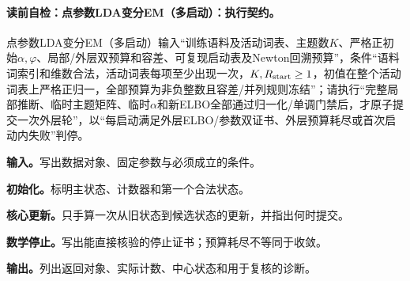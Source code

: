 \paragraph{读前自检：点参数LDA变分EM（多启动）：执行契约。}点参数LDA变分EM（多启动）输入“训练语料及活动词表、主题数$K$、严格正初始$\alpha,\varphi$、局部/外层双预算和容差、可复现启动表及Newton回溯预算”，条件“语料词索引和维数合法，活动词表每项至少出现一次，$K,R_{\rm start}\ge1$，初值在整个活动词表上严格正归一，全部预算为非负整数且容差/并列规则冻结”；请执行“完整局部推断、临时主题矩阵、临时$\alpha$和新ELBO全部通过归一化/单调门禁后，才原子提交一次外层轮”，以“每启动满足外层ELBO/参数双证书、外层预算耗尽或首次启动内失败”判停。\par
\begin{keypointbox}[title={点参数LDA变分EM（多启动）：五步阅读}]
\textbf{输入。}写出数据对象、固定参数与必须成立的条件。\par
\textbf{初始化。}标明主状态、计数器和第一个合法状态。\par
\textbf{核心更新。}只手算一次从旧状态到候选状态的更新，并指出何时提交。\par
\textbf{数学停止。}写出能直接核验的停止证书；预算耗尽不等同于收敛。\par
\textbf{输出。}列出返回对象、实际计数、中心状态和用于复核的诊断。
\end{keypointbox}

